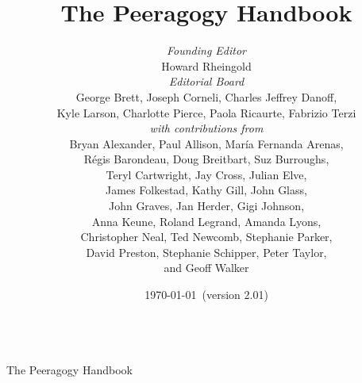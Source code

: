 \documentclass[ebook, 12pt, twoside]{memoir}
\begin{document}
\sloppy \pagestyle{empty} \thispagestyle{empty}
\begin{center}
\quad\\[1in] 
{\LARGE The Peeragogy Handbook}
\end{center}
\clearpage\mbox{}\clearpage    %
\title{The Peeragogy Handbook\\[.5in]}
\author{
\emph{Founding Editor}\\
{\small Howard Rheingold}\\[.3in]
\emph{Editorial Board}\\
{\small George Brett, Joseph Corneli, Charles Jeffrey Danoff,}\\
{\small Kyle Larson, Charlotte Pierce, Paola Ricaurte, Fabrizio Terzi}\\[.3in]


\emph{with contributions from} \\
{\small Bryan Alexander, Paul Allison, Mar\'ia Fernanda Arenas,} \\
{\small R\'egis Barondeau, Doug Breitbart, Suz Burroughs,}\\ 
{\small Teryl Cartwright, Jay Cross, Julian Elve,}\\
{\small James Folkestad, Kathy Gill, John Glass,}\\
{\small John Graves, Jan Herder, Gigi Johnson,} \\
{\small Anna Keune, Roland Legrand, Amanda Lyons,} \\
{\small Christopher Neal, Ted Newcomb, Stephanie Parker,} \\
{\small David Preston, Stephanie Schipper, Peter Taylor,} \\
{\small and Geoff Walker}
}
\date{\today\ (version 2.01)}
\maketitle
\thispagestyle{empty}
\end{document}
